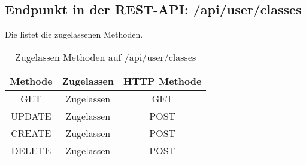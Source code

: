 \subsection{Endpunkt in der REST-API: /api/user/classes}
Die  listet die zugelassenen Methoden. 

\begin{table}[!htbp]
	\begin{tabular}{|c|c|c|}
		\hline
			\textbf{Methode} & \textbf{Zugelassen} & \textbf{HTTP Methode} \\ \hline
			GET & Zugelassen &  GET \\ \hline
			UPDATE & Zugelassen & POST \\ \hline 
			CREATE & Zugelassen & POST \\ \hline 
			DELETE & Zugelassen & POST \\ \hline
	\end{tabular}

		\caption{Zugelassen Methoden auf /api/user/classes}
		\label{tab:end:rest:api:user:classes:meth}
\end{table}